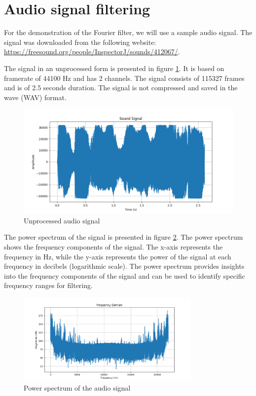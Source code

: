\documentclass[a4paper,12pt,fleqn]{article}
\begin{document}
\section{Audio signal filtering}

\hspace{1 em} For the demonstration of the Fourier filter, we will use a sample audio signal.
The signal was downloaded from the following website: \url{https://freesound.org/people/InspectorJ/sounds/412067/}.

The signal in an unprocessed form is presented in figure \ref{fig:unprocessed_signal}. 
It is based on framerate of 44100 Hz and has 2 channels. The signal consists of 115327 frames and is of 2.5 seconds duration.
The signal is not compressed and saved in the wave (WAV) format.
\begin{figure}[H]
    \centering
    \includegraphics[width=1\textwidth]{unprocessed_signal.png}
    \caption{Unprocessed audio signal}
    \label{fig:unprocessed_signal}
\end{figure}

The power spectrum of the signal is presented in figure \ref{fig:power_spectrum}. The power spectrum
shows the frequency components of the signal. The x-axis represents the frequency in Hz, while the y-axis
represents the power of the signal at each frequency in decibels (logarithmic scale). The power spectrum provides insights into the frequency
components of the signal and can be used to identify specific frequency ranges for filtering.


\begin{figure}[H]
    \centering
    \includegraphics[width=0.8\textwidth]{frequency_domain.png}
    \caption{Power spectrum of the audio signal}
    \label{fig:power_spectrum}
\end{figure}
\end{document}
